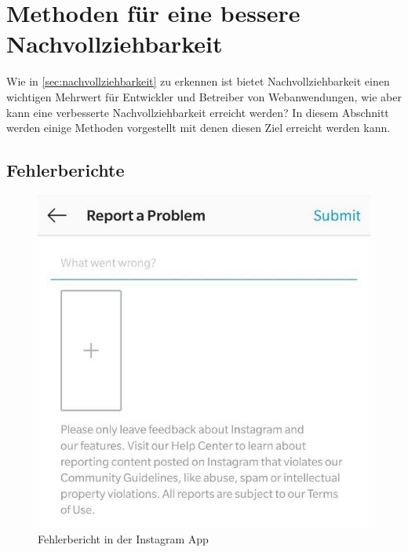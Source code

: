 

\section{Methoden für eine bessere Nachvollziehbarkeit}
\label{sec:methoden}

Wie in \autoref{sec:nachvollziehbarkeit} zu erkennen ist bietet Nachvollziehbarkeit einen wichtigen Mehrwert für Entwickler und Betreiber von Webanwendungen, wie aber kann eine verbesserte Nachvollziehbarkeit erreicht werden? In diesem Abschnitt werden einige Methoden vorgestellt mit denen diesen Ziel erreicht werden kann.

\subsection{Fehlerberichte}

\begin{figure}
\centering
\includegraphics[width=\linewidth]{img/instagram-feedback/instagram-feedback.jpg}
\caption{Fehlerbericht in der Instagram App \cite{Instagram}}
\label{fig:instagram-bug-report}
\end{figure}

